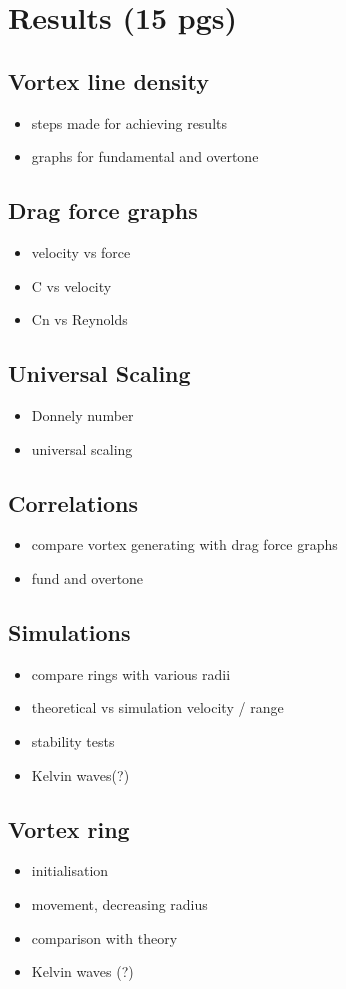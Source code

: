 \chapter{Results (15 pgs)}

\section{Vortex line density}
\begin{itemize}
	\item steps made for achieving results
	\item graphs for fundamental and overtone
\end{itemize}

\section{Drag force graphs}
\begin{itemize}
	\item velocity vs force
	\item C vs velocity
	\item Cn vs Reynolds
\end{itemize}

\section{Universal Scaling}
\begin{itemize}
	\item Donnely number
	\item universal scaling
\end{itemize}

\section{Correlations}
\begin{itemize}
	\item compare vortex generating with drag force graphs
	\item fund and overtone
\end{itemize}

\section{Simulations}
\begin{itemize}
	\item compare rings with various radii
	\item theoretical vs simulation velocity / range
	\item stability tests
	\item Kelvin waves(?)
\end{itemize}

\section{Vortex ring}
\begin{itemize}
	\item initialisation
	\item movement, decreasing radius
	\item comparison with theory
	\item Kelvin waves (?)
\end{itemize}

\newpage
